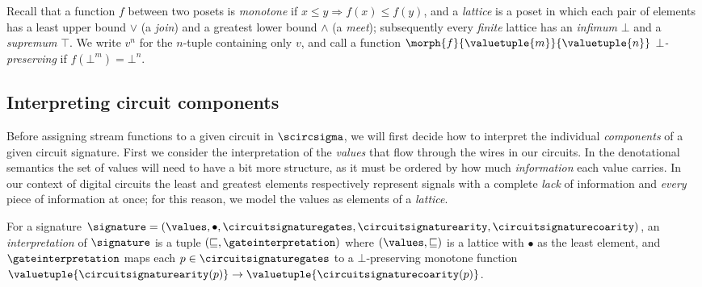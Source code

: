 \documentclass{lmcs}
\begin{document}
Recall that a function \(f\) between two posets is \emph{monotone}
if \(x \leq y \Rightarrow f(x) \leq f(y)\), and a \emph{lattice} is a poset
in which each pair of elements has a least upper bound \(\vee\) (a \emph{join})
and a greatest lower bound \(\wedge\) (a \emph{meet}); subsequently
every \emph{finite} lattice has an \emph{infimum} \(\bot\) and a \emph{supremum}
\(\top\).
We write \(v^n\) for the \(n\)-tuple containing only \(v\), and call a function
\(\morph{f}{\valuetuple{m}}{\valuetuple{n}}\) \emph{\(\bot\)-preserving} if
\(f(\bot^m) = \bot^n\).

\subsection{Interpreting circuit components}\label{sec:interpreting-components}

Before assigning stream functions to a given circuit in \(\scircsigma\), we will
first decide how to interpret the individual \emph{components} of a given
circuit signature.
First we consider the interpretation of the \emph{values} that flow through the
wires in our circuits.
In the denotational semantics the set of values will need to have a bit more
structure, as it must be ordered by how much \emph{information} each value
carries.
In our context of digital circuits the least and greatest elements respectively
represent signals with a complete \emph{lack} of information and \emph{every}
piece of information at once; for this reason, we model the values as elements
of a \emph{lattice}.

\begin{defi}[Interpretation]
    For a signature \(
    \signature = (
    \values, \bullet, \circuitsignaturegates, \circuitsignaturearity,
    \circuitsignaturecoarity
    )\), an \emph{interpretation} of
    \(\signature\) is a tuple \((\sqsubseteq, \gateinterpretation)\) where
    \((\values, \sqsubseteq)\) is a lattice with \(\bullet\) as the least
    element, and \(\gateinterpretation\) maps each
    \(p \in \circuitsignaturegates\) to a \(\bot\)-preserving monotone function
    \(
    \valuetuple{\circuitsignaturearity(p)}
    \to
    \valuetuple{\circuitsignaturecoarity(p)}
    \).
\end{defi}
\end{document}
